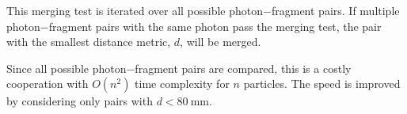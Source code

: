 

This merging test is iterated over all possible  photon$-$fragment pairs. If multiple photon$-$fragment pairs with the same photon pass the merging test, the pair with the smallest distance metric, $d$, will be merged.

Since all possible photon$-$fragment pairs are compared, this is a costly cooperation with $O(n^2)$ time complexity for $n$ particles. The speed is improved by considering only pairs with $d<80\ \text{mm}$.




